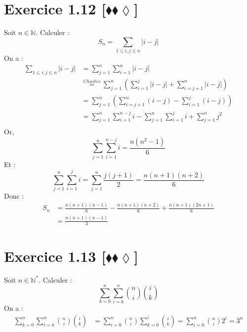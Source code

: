 \documentclass[10pt]{article}
\begin{document}
\section*{Exercice 1.12 [$\blacklozenge\blacklozenge\lozenge$]}
\begin{tcolorbox}[enhanced, width=7in, center, size=fbox, fontupper=\large, drop shadow southwest]
    Soit $n\in\mathbb{N}$. Calculer :
    \begin{equation*}
        S_n = \sum\limits_{1\leq i,j\leq n}{|i-j|}
    \end{equation*}
    On a :
    \begin{align*}
        \sum\limits_{1\leq i,j\leq n}{|i-j|}
        &=\sum\limits^{n}_{j=1}{\sum\limits^{n}_{i=1}{|i-j|}}\\
        &\stackrel{Chasles}{=}\sum\limits^{n}_{j=1}{\left(\sum\limits^{j}_{i=1}{|i-j|}+\sum\limits^{n}_{i=j+1}{|i-j|}\right)}\\
        &=\sum\limits^{n}_{j=1}{\left(\sum\limits^{n}_{i=j+1}{(i-j)}-\sum\limits^{j}_{i=1}{(i-j)}\right)}\\
        &=\sum\limits^{n}_{j=1}{\sum\limits^{n-j}_{i=1}{i}-\sum\limits^{n}_{j=1}\sum\limits^{j}_{i=1}{i}+\sum\limits^n_{j=1}j^2}\\
    \end{align*}
    Or,
    \begin{equation*}
        \sum^n_{j=1}{\sum^{n-j}_{i=1}{i}}=\frac{n(n^2-1)}{6}
    \end{equation*}
    Et :
    \begin{equation*}
        \sum^n_{j=1}\sum^j_{i=1}{i}=\sum^n_{j=1}{\frac{j(j+1)}{2}}=\frac{n(n+1)(n+2)}{6}
    \end{equation*}
    Donc :
    \begin{align*}
        S_n &= \frac{n(n+1)(n-1)}{6} - \frac{n(n+1)(n+2)}{6} + \frac{n(n+1)(2n+1)}{6}\\
            &= \frac{n(n+1)(n-1)}{3}
    \end{align*}
\end{tcolorbox}

\section*{Exercice 1.13 [$\blacklozenge\blacklozenge\lozenge$]}
\begin{tcolorbox}[enhanced, width=7in, center, size=fbox, fontupper=\large, drop shadow southwest]
    Soit $n\in\mathbb{N}^*$. Calculer :
    \begin{equation*}
        \sum^n_{k=0}\sum^n_{i=k}{\binom{n}{i}\binom{i}{k}}
    \end{equation*}
    On a :
    \begin{align*}
        \sum^n_{k=0}\sum^n_{i=k}{\binom{n}{i}\binom{i}{k}}&=\sum^n_{i=0}\binom{n}{i}\sum^i_{k=0}\binom{i}{k}=\sum^n_{i=0}\binom{n}{i}2^i=3^n
    \end{align*}
\end{tcolorbox}
\end{document}
